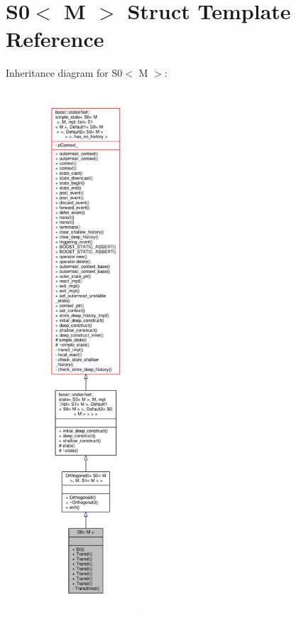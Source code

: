 \hypertarget{struct_s0}{}\section{S0$<$ M $>$ Struct Template Reference}
\label{struct_s0}


Inheritance diagram for S0$<$ M $>$\+:
\nopagebreak
\begin{figure}[H]
\begin{center}
\leavevmode
\includegraphics[height=550pt]{struct_s0__inherit__graph}
\end{center}
\end{figure}



